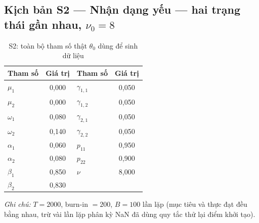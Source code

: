 \documentclass[11pt,a4paper]{article}
\begin{document}
\subsection*{Kịch bản S2 --- Nhận dạng yếu --- hai trạng thái gần nhau, $\nu_0=8$}
\begin{table}[H]\centering\small
\caption{S2: toàn bộ tham số thật $\theta_0$ dùng để sinh dữ liệu}
\begin{tabularx}{\textwidth}{l C  l C}
\toprule
\textbf{Tham số} & \textbf{Giá trị} & \textbf{Tham số} & \textbf{Giá trị} \\
\midrule
$\mu_1$ & 0,000 & $\gamma_{1,1}$ & 0,050 \\
$\mu_2$ & 0,000 & $\gamma_{1,2}$ & 0,050 \\
$\omega_1$ & 0,080 & $\gamma_{2,1}$ & 0,050 \\
$\omega_2$ & 0,140 & $\gamma_{2,2}$ & 0,050 \\
$\alpha_1$ & 0,060 & $p_{11}$ & 0,950 \\
$\alpha_2$ & 0,080 & $p_{22}$ & 0,900 \\
$\beta_1$ & 0,850 & $\nu$ & 8,000 \\
$\beta_2$ & 0,830 &  &  \\
\bottomrule
\end{tabularx}
\vspace{0.2em}\raggedright\scriptsize \emph{Ghi chú:} $T=2000$, burn-in $=200$, $B=100$ lần lặp (mục tiêu và thực đạt đều bằng nhau, trừ vài lần lặp phân kỳ NaN đã dùng quy tắc thử lại điểm khởi tạo).
\end{table}
\end{document}

